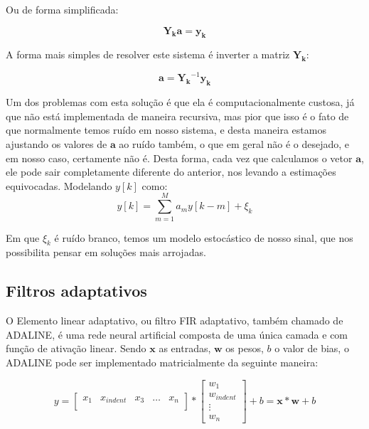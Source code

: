 \documentclass[a4paper, 12pt]{book}
\begin{document}
Ou de forma simplificada:

\begin{equation}
    \boldsymbol{Y_k}\boldsymbol{a}=\boldsymbol{y_k}
\end{equation}

A forma mais simples de resolver este sistema é inverter a matriz $\boldsymbol{Y_k}$:

\begin{equation}
    \boldsymbol{a}=\boldsymbol{Y_k}^{-1}\boldsymbol{y_k}
\end{equation}

Um dos problemas com esta solução é que ela é computacionalmente custosa, já  que não está implementada de maneira recursiva, mas pior que isso é o fato de que normalmente temos ruído em nosso sistema, e desta maneira estamos ajustando os valores de $\boldsymbol{a}$ ao ruído também, o que em geral não é o desejado, e em nosso caso, certamente não é. Desta forma, cada vez que calculamos o vetor $\boldsymbol{a}$, ele pode sair completamente diferente do anterior, nos levando a estimações equivocadas. Modelando $y[k]$ como:
\begin{equation}
    y[k]=\sum_{m=1}^{M}a_m y[k-m]+\xi_k
\end{equation}

Em que $\xi_k$ é ruído branco, temos um modelo estocástico de nosso sinal, que nos possibilita pensar em soluções mais arrojadas. 

\subsection{Filtros adaptativos}

\indent O Elemento linear adaptativo, ou filtro FIR adaptativo, também chamado de ADALINE, é uma rede neural artificial composta de uma única camada e com função de ativação linear. Sendo $\boldsymbol{x}$ as entradas, $\boldsymbol{w}$ os pesos, $b$ o valor de bias, o ADALINE pode ser implementado matricialmente da seguinte maneira:


\begin{equation}
    y=
    \begin{bmatrix}
    x_{1} & x_{indent} & x_{3} & \dots & x_{n} \\
    \end{bmatrix}
    *
    \begin{bmatrix}
    w_{1}  \\
    w_{indent}  \\
    \vdots  \\
    w_{n} 
    \end{bmatrix}
    + b = \boldsymbol{x}*\boldsymbol{w}+b
\end{equation}
\end{document}
